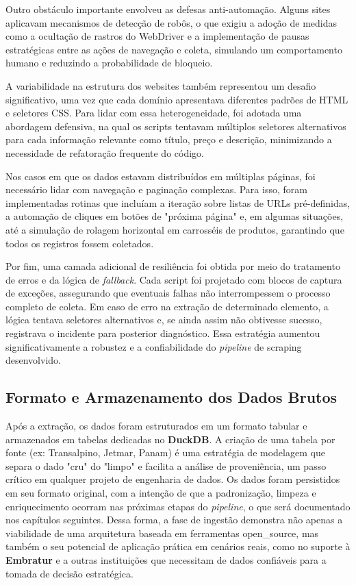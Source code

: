 Outro obstáculo importante envolveu as defesas anti-automação. Alguns sites aplicavam mecanismos de detecção de robôs, o que exigiu a adoção de medidas como a ocultação de rastros do WebDriver e a implementação de pausas estratégicas entre as ações de navegação e coleta, simulando um comportamento humano e reduzindo a probabilidade de bloqueio.

A variabilidade na estrutura dos websites também representou um desafio significativo, uma vez que cada domínio apresentava diferentes padrões de HTML e seletores CSS. Para lidar com essa heterogeneidade, foi adotada uma abordagem defensiva, na qual os scripts tentavam múltiplos seletores alternativos para cada informação relevante como título, preço e descrição, minimizando a necessidade de refatoração frequente do código.

Nos casos em que os dados estavam distribuídos em múltiplas páginas, foi necessário lidar com navegação e paginação complexas. Para isso, foram implementadas rotinas que incluíam a iteração sobre listas de URLs pré-definidas, a automação de cliques em botões de "próxima página" e, em algumas situações, até a simulação de rolagem horizontal em carrosséis de produtos, garantindo que todos os registros fossem coletados.

Por fim, uma camada adicional de resiliência foi obtida por meio do tratamento de erros e da lógica de \textit{fallback}. Cada script foi projetado com blocos de captura de exceções, assegurando que eventuais falhas não interrompessem o processo completo de coleta. Em caso de erro na extração de determinado elemento, a lógica tentava seletores alternativos e, se ainda assim não obtivesse sucesso, registrava o incidente para posterior diagnóstico. Essa estratégia aumentou significativamente a robustez e a confiabilidade do \textit{pipeline} de scraping desenvolvido.

\subsection{Formato e Armazenamento dos Dados Brutos}

Após a extração, os dados foram estruturados em um formato tabular e armazenados em tabelas dedicadas no \textbf{DuckDB}. A criação de uma tabela por fonte (ex: Transalpino, Jetmar, Panam) é uma estratégia de modelagem que separa o dado "cru" do "limpo" e facilita a análise de proveniência, um passo crítico em qualquer projeto de engenharia de dados. Os dados foram persistidos em seu formato original, com a intenção de que a padronização, limpeza e enriquecimento ocorram nas próximas etapas do \textit{pipeline}, o que será documentado nos capítulos seguintes. Dessa forma, a fase de ingestão demonstra não apenas a viabilidade de uma arquitetura baseada em ferramentas \acs{open_source}, mas também o seu potencial de aplicação prática em cenários reais, como no suporte à \textbf{Embratur} e a outras instituições que necessitam de dados confiáveis para a tomada de decisão estratégica.

